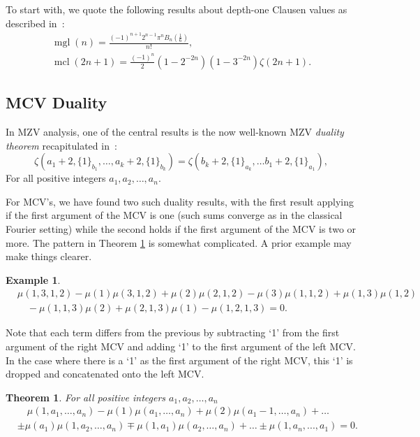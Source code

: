 \documentclass[a4paper,a4paper]{article}
\newtheorem{Thm}{Theorem}
\newtheorem{Eg}{Example}
\newcommand{\mcl}{\operatorname{mcl}}
\newcommand{\mgl}{\operatorname{mgl}}
\begin{document}
To start with, we quote the following results about depth-one Clausen values
as described  in~\cite{L}:
\begin{gather}
\mgl(n) = \frac{(-1)^{n+1}2^{n-1}\pi^n B_n(\frac{1}{6})}{n!}, \label{eq:l1} \\
\mcl(2n+1) = \frac{(-1)^n}{2}(1-2^{-2n})(1-3^{-2n})\zeta(2n+1). \label{eq:l2}
\end{gather}

\subsection{MCV Duality}

In MZV analysis, one of the central results is the now well-known MZV
 {\em duality theorem} recapitulated in~\cite{BBB}:
\begin{equation}
\label{eq:mzdu}
\zeta(a_1 + 2,\{ 1 \}_{b_1}, \dots, a_k + 2, \{ 1 \}_{b_k})
= \zeta(b_k + 2,\{1\}_{a_k}, \dots b_1+2,\{1\}_{a_1}),
\end{equation}
 For all positive integers $a_1, a_2, \dots, a_n$.

For MCV's, we have found two such duality results,
with the first result applying if the first argument of the MCV is
one
(such sums converge as in the classical Fourier setting)
while the second holds if the first argument of the MCV is
two or more.
The pattern  in Theorem \ref{mcvd1}
is somewhat complicated.  A prior  example may make things clearer.

\begin{Eg}
\begin{equation*}
\begin{split}
&\mu(1,3,1,2) - \mu(1)\mu(3,1,2) + \mu(2)\mu(2,1,2) - \mu(3)\mu(1,1,2)
+ \mu(1,3)\mu(1,2) \\
&\quad -\mu(1,1,3)\mu(2) + \mu(2,1,3)\mu(1) - \mu(1,2,1,3) = 0.
\end{split}
\end{equation*}
\end{Eg}

Note that each term differs from the previous by subtracting `1' from
the first argument of the right MCV and adding `1' to the first
argument of the left MCV.  In the case where there is a `1' as the
first argument of the right MCV, this `1' is dropped and concatenated
onto the left MCV.

\begin{Thm} \label{mcvd1} For all positive integers $a_1, a_2, \dots, a_n$
\begin{equation}
\begin{split}
\label{eq:mcdu2}
&\quad \mu(1,a_1, \dots, a_n) - \mu(1)\mu(a_1, \dots, a_n)
+ \mu(2)\mu(a_1 - 1, \dots, a_n) + \dots \\
&\pm \mu(a_1)\mu(1, a_2, \dots , a_n) \mp
\mu(1,  a_1)\mu(a_2, \dots , a_n) + \dots \pm \mu(1, a_n, ..., a_1) =
0.
\end{split}
\end{equation}
\end{Thm}
\end{document}
